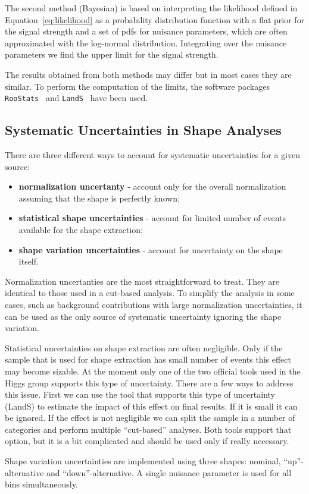 The second method (Bayesian) is based on interpreting the likelihood
defined in Equation~\ref{eq:likelihood} as a probability distribution
function with a flat prior for the signal strength and a set of pdfs
for nuisance parameters, which are often approximated with the
log-normal distribution. Integrating over the nuisance parameters we
find the upper limit for the signal strength.

The results obtained from both methods may differ but in most cases
they are similar. To perform the computation of the limits, the
software packages
\texttt{RooStats}~\cite{rootstat} and \texttt{LandS}~\cite{lands} have 
been used.

\subsection{Systematic Uncertainties in Shape Analyses} 

There are three different ways to account for systematic uncertainties for a 
given source:
\begin{itemize}
  \item {\bf normalization uncertanty} - account only for the overall
    normalization assuming that the shape is perfectly known;
  \item {\bf statistical shape uncertainties} - account for limited
    number of events available for the shape extraction;
  \item {\bf shape variation uncertainties} - account for uncertainty
    on the shape itself.
\end{itemize}

Normalization uncertanties are the most straightforward to treat. They
are identical to those used in a cut-based analysis. To simplify the
analysis in some cases, such as background contributions with
large normalization uncertainties, it can be used as the only source of
systematic uncertainty ignoring the shape variation.

Statistical uncertainties on shape extraction are often
negligible. Only if the sample that is used for shape extraction has
small number of events this effect may become sizable. At the moment
only one of the two official tools used in the Higgs group supports
this type of uncertainty. There are a few ways to address this
issue. First we can use the tool that supports this type of
uncertainty (LandS) to estimate the impact of this effect on final
results. If it is small it can be ignored. If the effect is not
negligible we can split the sample in a number of categories and
perform multiple ``cut-based'' analyses. Both tools support that
option, but it is a bit complicated and should be used only if really
necessary.

Shape variation uncertainties are implemented using three shapes:
nominal, ``up''-alternative and ``down''-alternative. A single
nuisance parameter is used for all bins simultaneously.
